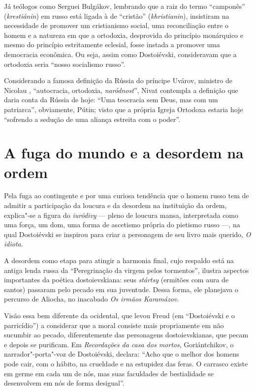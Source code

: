 Já teólogos como Serguei Bulgákov, lembrando que a raiz do termo ``camponês'' (\emph{krestiánin}) em russo está ligada à de ``cristão'' (\emph{khristianin}), insistiram na necessidade de promover um cristianismo social, uma reconciliação entre o homem e a natureza em que a ortodoxia, desprovida do princípio monárquico e mesmo do princípio estritamente eclesial, fosse instada a promover uma democracia econômica. Ou seja, assim como Dostoiévski, consideravam que a ortodoxia seria ``nosso socialismo russo''.

Considerando a famosa definição da Rússia do príncipe Uvárov, ministro de Nicolau , ``autocracia, ortodoxia, \emph{naródnost}'', Nivat contempla a definição que daria conta da Rússia de hoje: ``Uma teocracia sem Deus, mas com um patriarca'', obviamente, Pútin; visto que a própria Igreja Ortodoxa estaria hoje ``sofrendo a sedução de uma aliança estreita com o poder''.

\section{\uppercase{A} fuga do mundo e a desordem na ordem}

Pela fuga ao contingente e por uma curiosa tendência que o homem russo
tem de admitir a participação da loucura e da desordem na instituição da
ordem, explica"-se a figura do \emph{iuródivy} --- pleno de loucura mansa,
interpretada como uma força, um dom, uma forma de ascetismo própria do
pietismo russo ---, na qual Dostoiévski se inspirou para criar a
personagem de seu livro mais querido, \emph{O idiota}.

A desordem como etapa para atingir a harmonia final, cujo respaldo está na antiga lenda russa da ``Peregrinação da virgem pelos tormentos'', ilustra aspectos importantes da poética dostoievskiana: seus \emph{stártsy} (ermitões com aura de santos) passaram pelo pecado em sua juventude. Dessa forma, ele planejava o percurso de Aliocha, no inacabado \emph{Os irmãos Karamázov}.

Visão essa bem diferente da ocidental, que levou Freud
(em ``Dostoiévski e o parricídio'') a considerar que a moral consiste
mais propriamente em não sucumbir ao pecado, diferentemente das
personagens dostoievskianas, que pecam e depois se purificam.
Em \emph{Recordações da casa dos mortos}, Goriántchikov, o
narrador"-porta"-voz de Dostoiévski, declara: ``Acho que o melhor dos
homens pode cair, com o hábito, na crueldade e na estupidez das feras. O carrasco existe em germe em cada um de nós, mas suas faculdades de bestialidade se desenvolvem em nós de forma desigual''.

